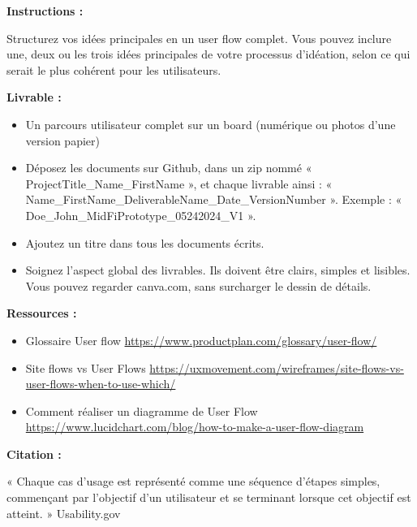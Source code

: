 \makeheaderfiles

\textbf{Instructions :}

Structurez vos idées principales en un user flow complet.
Vous pouvez inclure une, deux ou les trois idées principales de votre processus d'idéation, selon ce qui serait le plus cohérent pour les utilisateurs.

\textbf{Livrable :}

\begin{itemize}
\item Un parcours utilisateur complet sur un board (numérique ou photos d'une version papier)
\item Déposez les documents sur Github, dans un zip nommé « ProjectTitle\_Name\_FirstName », et chaque livrable ainsi : « Name\_FirstName\_DeliverableName\_Date\_VersionNumber ». Exemple : « Doe\_John\_MidFiPrototype\_05242024\_V1 ».
\item Ajoutez un titre dans tous les documents écrits.
\item Soignez l'aspect global des livrables. Ils doivent être clairs, simples et lisibles. Vous pouvez regarder canva.com, sans surcharger le dessin de détails.
\end{itemize}

\textbf{Ressources :}

\begin{itemize}
\item Glossaire User flow \url{https://www.productplan.com/glossary/user-flow/}
\item Site flows vs User Flows \url{https://uxmovement.com/wireframes/site-flows-vs-user-flows-when-to-use-which/}
\item Comment réaliser un diagramme de User Flow \url{https://www.lucidchart.com/blog/how-to-make-a-user-flow-diagram}
\end{itemize}

\textbf{Citation :}

« Chaque cas d'usage est représenté comme une séquence d'étapes simples, commençant par l'objectif d'un utilisateur et se terminant lorsque cet objectif est atteint. » Usability.gov

